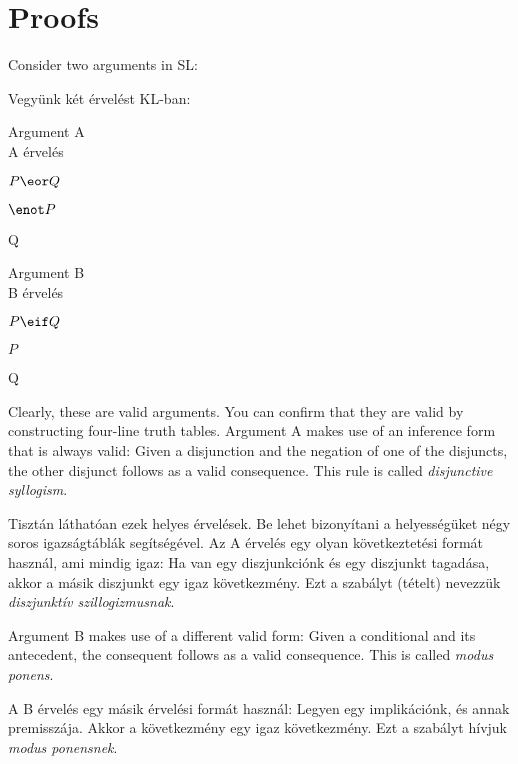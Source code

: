 

\chapter{Proofs}
\label{ch.proofs}

Consider two arguments in SL:

Vegyünk két érvelést KL-ban:

\begin{multicols}{2}
Argument A\\
A érvelés
\begin{earg}
\item[] $P \eor Q$
\item[] $\enot P$
\item[\therefore] Q
\end{earg}

Argument B \\
B érvelés
\begin{earg}
\item[] $P \eif Q$
\item[] $P$
\item[\therefore] Q
\end{earg}

\end{multicols}

Clearly, these are valid arguments. You can confirm that they are valid by constructing four-line truth tables. Argument A makes use of an inference form that is always valid: Given a disjunction and the negation of one of the disjuncts, the other disjunct follows as a valid consequence. This rule is called \emph{disjunctive syllogism}.

Tisztán láthatóan ezek helyes érvelések. Be lehet bizonyítani a helyességüket négy soros igazságtáblák segítségével. Az A érvelés egy olyan következtetési formát használ, ami mindig igaz: Ha van egy diszjunkciónk és egy diszjunkt tagadása, akkor a másik diszjunkt egy igaz következmény. Ezt a szabályt (tételt) nevezzük \emph{diszjunktív szillogizmusnak}.

Argument B makes use of a different valid form: Given a conditional and its antecedent, the consequent follows as a valid consequence. This is called \emph{modus ponens}.

A B érvelés egy másik érvelési formát használ: Legyen egy implikációnk, és annak premisszája. Akkor a következmény egy igaz következmény. Ezt a szabályt hívjuk \emph{modus ponensnek}.

